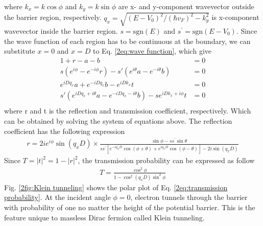     where $k_x = k \cos{\phi}$ and $k_y = k \sin{\phi}$ are x- and y-component wavevector outside the barrier region, respectively.
    $q_x = \sqrt{(E-V_0)^2/(\hbar v_F)^2-k_y^2}$ is x-component wavevector inside the barrier region. 
    $s = \mathrm{sgn}(E)$ and $s^{\prime} = \mathrm{sgn}(E-V_0)$. 
    Since the wave function of each region has to be continuous at the boundary, we can substitute $x = 0$ and $x = D$ to Eq. \ref{2eq:wave function}, which give
    \begin{equation} \label{2eq:boundary condition}
        \begin{aligned}
            1+r-a-b&=0\\
            s(e^{i\phi}-e^{-i\phi}r)-s\prime (e^{i\theta}a-e^{-i\theta}b)&=0\\
            e^{iDq_x}a+e^{-iDq_x}b-e^{iDk_x}t&=0\\
            s \prime (e^{iDq_x+i\theta}a-e^{-iDq_x-i\theta} b)-se^{iDk_x+i\phi}t&=0\\
        \end{aligned}
    \end{equation}
    where r and t is the reflection and transmission coefficient, respectively. Which can be obtained by solving the system of equations above.
    The reflection coefficient has the following expression
    \begin{align} \label{2eq:reflection coefficient}
        r=2ie^{i\phi}\sin{(q_xD)}\times\frac{\sin{\phi}-ss^{\prime}\sin{\theta}}{ss^{\prime}[e^{-iq_xD}\cos{(\phi+\theta)}+e^{iq_xD}\cos{(\phi-\theta)}]-2i\sin{(q_xD)}}
    \end{align}
    Since $T = |t|^2 = 1-|r|^2$, the transmission probability can be expressed as follow
    \begin{align} \label{2eq:transmission probability}
        T = \frac{\cos^2{\phi}}{1-\cos^2{(q_x D)}\sin^2{\phi}}
    \end{align}
    Fig. \ref{2fig:Klein tunneling} shows the polar plot of Eq. \ref{2eq:transmission probability}. 
    At the incident angle $\phi = 0$, electron tunnels through the barrier with probability of one no matter the height of the potential barrier.
    This is the feature unique to massless Dirac fermion called Klein tunneling.
